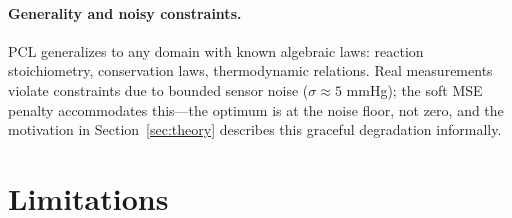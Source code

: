 \documentclass{article}
\begin{document}
\paragraph{Generality and noisy constraints.}
PCL generalizes to any domain with known algebraic laws: reaction stoichiometry, conservation laws, thermodynamic relations.
Real measurements violate constraints due to bounded sensor noise ($\sigma \approx 5$ mmHg); the soft MSE penalty accommodates this---the optimum is at the noise floor, not zero, and the motivation in Section~\ref{sec:theory} describes this graceful degradation informally.

\section{Limitations}
\label{sec:limitations}
\end{document}
